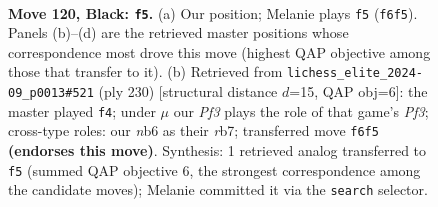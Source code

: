 \documentclass[11pt]{article}
\begin{document}
\begin{figure}[p]\centering
\begin{subfigure}{0.46\textwidth}\centering
\resizebox{\linewidth}{!}{%
\newchessgame
\chessboard[
  setfen={8/4R1p1/1N3pk1/7p/7P/6PK/r7/8 b - - 65 120},
  showmover=false,
  pgfstyle=straightmove, color=movearrow, markmove={f6-f5}
]}
\caption{}
\end{subfigure}\hfill
\begin{subfigure}{0.46\textwidth}\centering
\resizebox{\linewidth}{!}{%
\newchessgame
\chessboard[
  setfen={8/1r6/6pk/7p/R6P/5PP1/5K2/8 w - - 41 116},
  showmover=false,
  pgfstyle=straightmove, color=movearrow, markmove={f3-f4}
]}
\caption{}
\end{subfigure}
\\[4pt]

\caption{\textbf{Move 120, Black: \texttt{f5}.} (a) Our position; Melanie plays \texttt{f5} (\texttt{f6f5}). Panels (b)--(d) are the retrieved master positions whose correspondence most drove this move (highest QAP objective among those that transfer to it). (b) Retrieved from \texttt{lichess\_elite\_2024-09\_p0013\#521} (ply 230) [structural distance $d$=15, QAP obj=6]: the master played \texttt{f4}; under $\mu$ our \emph{Pf3} plays the role of that game's \emph{Pf3}; cross-type roles: our \emph{n}b6 as their \emph{r}b7; transferred move \texttt{f6f5} \textbf{(endorses this move)}. Synthesis: 1 retrieved analog transferred to \texttt{f5} (summed QAP objective 6, the strongest correspondence among the candidate moves); Melanie committed it via the \texttt{search} selector.}
\label{fig:thought-m239}
\end{figure}

\clearpage
\end{document}
